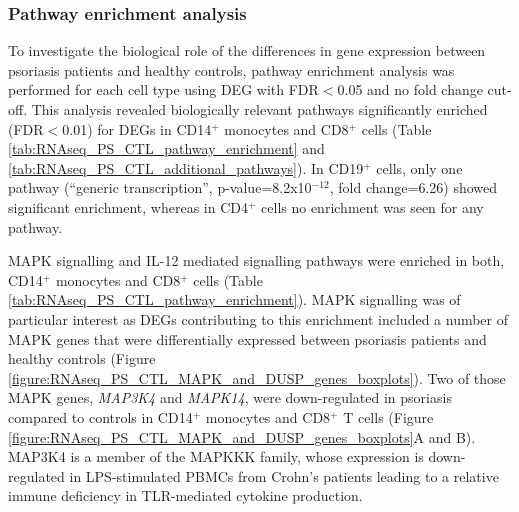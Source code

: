 \subsubsection{Pathway enrichment analysis}

To investigate the biological role of the differences in gene expression between psoriasis patients and healthy controls, pathway enrichment analysis was performed for each cell type using DEG with FDR$<$0.05 and no fold change cut-off. This analysis revealed biologically relevant pathways significantly enriched (FDR$<$0.01) for DEGs in CD14$^+$ monocytes and CD8$^+$ cells (Table \ref{tab:RNAseq_PS_CTL_pathway_enrichment} and \ref{tab:RNAseq_PS_CTL_additional_pathways}). In CD19$^+$ cells, only one pathway (“generic transcription”, p-value=8.2x10$^{-12}$, fold change=6.26) showed significant enrichment, whereas in CD4$^+$ cells no enrichment was seen for any pathway. 



MAPK signalling and IL-12 mediated signalling pathways were enriched in both, CD14$^+$ monocytes and CD8$^+$ cells (Table \ref{tab:RNAseq_PS_CTL_pathway_enrichment}). MAPK signalling was of particular interest as DEGs contributing to this enrichment included a number of MAPK genes that were differentially expressed between psoriasis patients and healthy controls (Figure \ref{figure:RNAseq_PS_CTL_MAPK_and_DUSP_genes_boxplots}). Two of those MAPK genes, \textit{MAP3K4} and \textit{MAPK14}, were down-regulated in psoriasis compared to controls in CD14$^+$ monocytes and CD8$^+$ T cells (Figure \ref{figure:RNAseq_PS_CTL_MAPK_and_DUSP_genes_boxplots}A and B). MAP3K4 is a member of the MAPKKK family, whose expression is down-regulated in LPS-stimulated PBMCs from Crohn's patients leading to a relative immune deficiency in TLR-mediated cytokine production.

